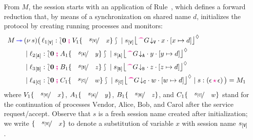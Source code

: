 \documentclass[runningheads,plain]{llncs}
\begin{document}
From $M$, the session starts with 
an application of  Rule~, which 
defines a forward reduction that, by means of a synchronization on shared name $d$,
initializes the protocol by creating running processes and monitors:
\begin{align*}
M  \fw & \news{s}\big(\, 
\np{\key{{\loc_1}}{\pS}}{ \conf{\inact}{V_1\subst{\epS}{x}}} \Par 
\hmoni{\ep{s}{\pS}}{\past \tproj{G}{\pS}}{x}{\upd{x}{d}}  
\\
& \Par \np{\key{{\loc_2}}{\pA}}{ \conf{\inact}{A_1\subst{\epA}{y}}} \Par 
\hmoni{\ep{s}{\pA}}{\past \tproj{G}{\pA}}{y}{\upd{y}{d}} 
\\
& \Par \np{\key{{\loc_3}}{\pB}}{ \conf{\inact}{B_1\subst{\epB}{z}}} \Par 
\hmoni{\ep{s}{\pB}}{\past \tproj{G}{\pB}}{z}{\upd{z}{d}} 
\\
& \Par \np{\key{{\loc_4}}{\pC}}{ \conf{\inact}{C_1\subst{\epC}{w}}} \Par 
\hmoni{\ep{s}{\pC}}{\past \tproj{G}{\pC}}{w}{\upd{w}{d}}  
  \Par \codah{s}{\emp}{\emp}{}~\big)  = M_1
\end{align*}
where 
$V_1\subst{\epS}{x}$, $A_1\subst{\epA}{y}$, $B_1\subst{\epB}{z}$, and $C_1\subst{\epC}{w}$ 
stand for the continuation of processes $\text{Vendor}$, $\text{Alice}$, $\text{Bob}$, and $\text{Carol}$ after the service 
request/accept. 
Observe that $s$ is a fresh session name created after initialization; 
we write  $\subst{\epS}{x}$ to denote a substitution of variable $x$ with session name $s_{[\mathtt{V}]}$.
\end{document}
